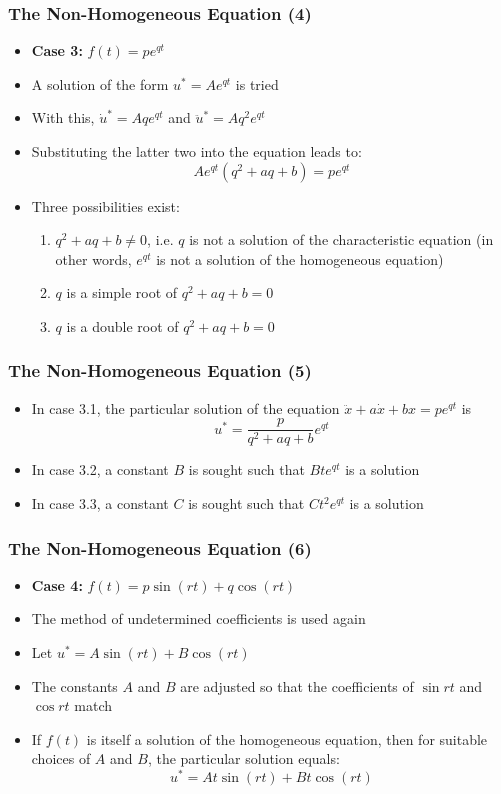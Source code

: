 \documentclass[10pt,usenames,dvipsnames]{beamer}
\theoremstyle{definition}
\begin{document}
\begin{frame}[fragile]
\frametitle{The Non-Homogeneous Equation (4)}
\begin{itemize}
	\item \textbf{Case 3:} $f(t) = pe^{qt}$
	\item A solution of the form $u^{*} = Ae^{qt}$ is tried
	\item With this, $\dot{u}^{*} = Aqe^{qt}$ and $\ddot{u}^{*} = Aq^{2}e^{qt}$
	\item Substituting the latter two into the equation leads to:
	\[
		Ae^{qt}(q^{2} + aq + b) = pe^{qt}
	\]
	\item Three possibilities exist:
	\begin{enumerate}
		\item $q^{2} + aq + b \neq 0$, i.e. $q$ is not a solution of the characteristic equation (in other words, $e^{qt}$ is not a solution of the homogeneous equation)
		\item $q$ is a simple root of $q^{2} + aq + b = 0$
		\item $q$ is a double root of $q^{2} + aq + b = 0$
	\end{enumerate}
\end{itemize}
\end{frame}

\begin{frame}[fragile]
\frametitle{The Non-Homogeneous Equation (5)}
\begin{itemize}
	\item In case 3.1, the particular solution of the equation $\ddot{x} + a\dot{x} + bx = pe^{qt}$ is
	\[
		u^{*} = \dfrac{p}{q^{2} + aq + b}e^{qt}
	\]
	\item In case 3.2, a constant $B$ is sought such that $Bte^{qt}$ is a solution
	\item In case 3.3, a constant $C$ is sought such that $Ct^{2}e^{qt}$ is a solution
\end{itemize}
\end{frame}

\begin{frame}[fragile]
\frametitle{The Non-Homogeneous Equation (6)}
\begin{itemize}
	\item \textbf{Case 4:} $f(t) = p\sin (rt) + q\cos (rt)$
	\item The method of undetermined coefficients is used again
	\item Let $u^{*} = A\sin (rt) + B\cos (rt) $
	\item The constants $A$ and $B$ are adjusted so that the coefficients of $\sin rt$ and $\cos rt$ match
	\item If $f(t)$ is itself a solution of the homogeneous equation, then for suitable choices of $A$ and $B$, the particular solution equals:
	\[
		u^{*} = At\sin (rt) + Bt\cos (rt)
	\]
\end{itemize}
\end{frame}
\end{document}
